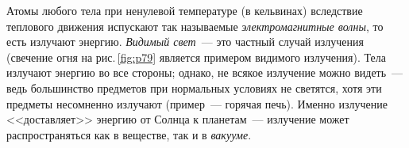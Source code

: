 \documentclass[main.tex]{subfiles}
\begin{document}
{{%







    \smallskip
    
    Атомы любого тела при ненулевой температуре (в кельвинах) вследствие теплового движения испускают так называемые \emph{электромагнитные волны}\footnotemark, то есть излучают энергию. \emph{Видимый свет}~--- это частный случай излучения (свечение огня на рис.\,\ref{fig:p79} является примером видимого излучения). Тела излучают энергию во все стороны; однако, не всякое излучение можно видеть~--- ведь большинство предметов при нормальных условиях не светятся, хотя эти предметы несомненно излучают (пример~--- горячая печь). Именно излучение <<доставляет>> энергию от Солнца к планетам~--- излучение может распространяться как в веществе, так и в \emph{вакууме}.
   
}

}























 
\end{document}
